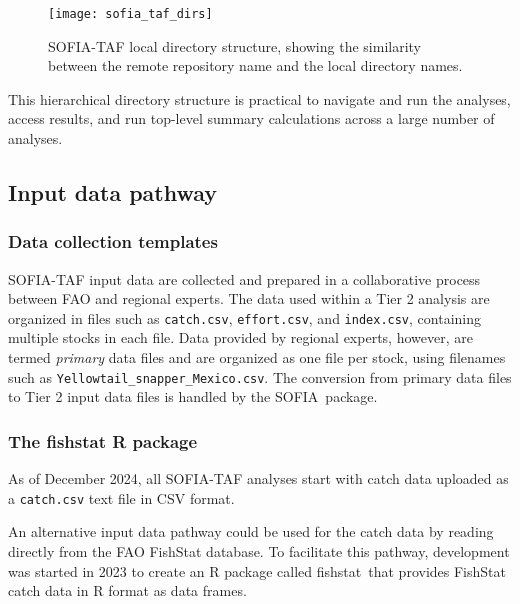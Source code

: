 \documentclass[12pt]{article}
\newcommand\fishstat{{\sf fishstat}}
\newcommand\SOFIA{{\sf SOFIA}}
\begin{document}
\begin{figure}[htb]
  \begin{center}
    \texttt{[image: sofia\_taf\_dirs]}
    \vspace{1ex}
    \caption{SOFIA-TAF local directory structure, showing the similarity between
      the remote repository name and the local directory names.}
    \label{fig:sofia-taf-dirs}
  \end{center}
\end{figure}

\vspace{1ex}

This hierarchical directory structure is practical to navigate and run the
analyses, access results, and run top-level summary calculations across a large
number of analyses.

\newpage

\subsection{Input data pathway}

\subsubsection{Data collection templates}

SOFIA-TAF input data are collected and prepared in a collaborative process
between FAO and regional experts. The data used within a Tier 2 analysis are
organized in files such as \verb|catch.csv|, \verb|effort.csv|, and
\verb|index.csv|, containing multiple stocks in each file. Data provided by
regional experts, however, are termed {\it primary} data files and are organized
as one file per stock, using filenames such as
\verb|Yellowtail_snapper_Mexico.csv|. The conversion from primary data files to
Tier 2 input data files is handled by the \SOFIA\ package.

\subsubsection{The fishstat R package}

As of December 2024, all SOFIA-TAF analyses start with catch data uploaded as
a \verb|catch.csv| text file in CSV format.

An alternative input data pathway could be used for the catch data by reading
directly from the FAO FishStat database. To facilitate this pathway, development
was started in 2023 to create an R package called \fishstat\ that provides
FishStat catch data in R format as data frames.
\end{document}

